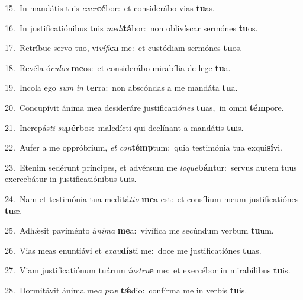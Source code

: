 {\numbfont\textcolor{\numbcolor}{15.}}~In mandátis tuis \textit{ex}\-\textit{er}\textbf{cé}bor:~\star et considerábo vias \textbf{tu}\-as.\par
{\numbfont\textcolor{\numbcolor}{16.}}~In justificatiónibus tuis \textit{me}\-\textit{di}\textbf{tá}bor:~\star non oblivíscar sermónes \textbf{tu}\-os.\par
{\numbfont\textcolor{\numbcolor}{17.}}~Retríbue servo tuo, vi\-\textit{ví}\-\textit{fi}\textbf{ca} me:~\star et custódiam sermónes \textbf{tu}\-os.\par
{\numbfont\textcolor{\numbcolor}{18.}}~Revéla ó\-\textit{cu}\-\textit{los} \textbf{me}\-os:~\star et considerábo mirabília de lege \textbf{tu}\-a.\par
{\numbfont\textcolor{\numbcolor}{19.}}~Incola ego \textit{sum} \textit{in} \textbf{ter}\-ra:~\star non abscóndas a me mandáta \textbf{tu}\-a.\par
{\numbfont\textcolor{\numbcolor}{20.}}~Concupívit ánima mea desideráre justificati\-\textit{ó}\-\textit{nes} \textbf{tu}\-as,~\star in omni \textbf{tém}\-pore.\par
{\numbfont\textcolor{\numbcolor}{21.}}~Increpás\textit{ti} \textit{su}\-\textbf{pér}bos:~\star maledícti qui declínant a mandátis \textbf{tu}\-is.\par
{\numbfont\textcolor{\numbcolor}{22.}}~Aufer a me oppróbrium, \textit{et} \textit{con}\-\textbf{témp}tum:~\star quia testimónia tua exqui\-\textbf{sí}\-vi.\par
{\numbfont\textcolor{\numbcolor}{23.}}~Etenim sedérunt príncipes, et advérsum me \textit{lo}\-\textit{que}\textbf{bán}tur:~\star servus autem tuus exercebátur in justificatiónibus \textbf{tu}\-is.\par
{\numbfont\textcolor{\numbcolor}{24.}}~Nam et testimónia tua meditá\-\textit{ti}\-\textit{o} \textbf{me}\-a est:~\star et consílium meum justificatiónes \textbf{tu}\-æ.\par
{\numbfont\textcolor{\numbcolor}{25.}}~Adhǽsit paviménto á\-\textit{ni}\-\textit{ma} \textbf{me}\-a:~\star vivífica me secúndum verbum \textbf{tu}\-um.\par
{\numbfont\textcolor{\numbcolor}{26.}}~Vias meas enuntiávi et \textit{ex}\-\textit{au}\textbf{dís}ti me:~\star doce me justificatiónes \textbf{tu}\-as.\par
{\numbfont\textcolor{\numbcolor}{27.}}~Viam justificatiónum tuárum \textit{ín}\-\textit{stru}\textbf{e} me:~\star et exercébor in mirabílibus \textbf{tu}\-is.\par
{\numbfont\textcolor{\numbcolor}{28.}}~Dormitávit ánima me\textit{a} \textit{præ} \textbf{tǽ}\-dio:~\star confírma me in verbis \textbf{tu}\-is.\par
